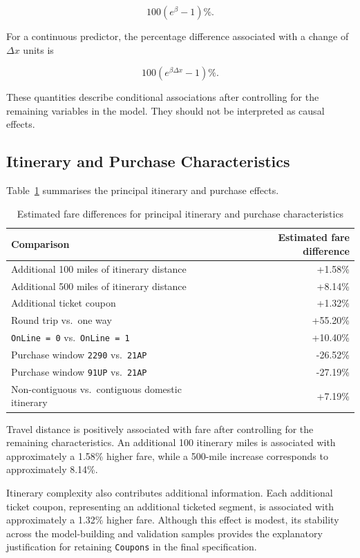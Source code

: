 \documentclass[11pt,a4paper]{article}
\begin{document}
\[
100\left(e^\beta-1\right)\%.
\]

For a continuous predictor, the percentage difference associated with a change of \(\Delta x\) units is

\[
100\left(e^{\beta \Delta x}-1\right)\%.
\]

These quantities describe conditional associations after controlling for the remaining variables in the model. They should not be interpreted as causal effects.

\subsection{Itinerary and Purchase Characteristics}

Table~\ref{tab:main-economic-effects} summarises the principal itinerary and purchase effects.

\begin{table}[H]
\centering
\caption{Estimated fare differences for principal itinerary and purchase characteristics}
\label{tab:main-economic-effects}
\begin{tabular}{lr}
\toprule
\textbf{Comparison} & \textbf{Estimated fare difference} \\
\midrule
Additional 100 miles of itinerary distance & +1.58\% \\
Additional 500 miles of itinerary distance & +8.14\% \\
Additional ticket coupon & +1.32\% \\
Round trip vs.\ one way & +55.20\% \\
\texttt{OnLine = 0} vs.\ \texttt{OnLine = 1} & +10.40\% \\
Purchase window \texttt{2290} vs.\ \texttt{21AP} & -26.52\% \\
Purchase window \texttt{91UP} vs.\ \texttt{21AP} & -27.19\% \\
Non-contiguous vs.\ contiguous domestic itinerary & +7.19\% \\
\bottomrule
\end{tabular}
\end{table}

Travel distance is positively associated with fare after controlling for the remaining characteristics. An additional 100 itinerary miles is associated with approximately a 1.58\% higher fare, while a 500-mile increase corresponds to approximately 8.14\%.

Itinerary complexity also contributes additional information. Each additional ticket coupon, representing an additional ticketed segment, is associated with approximately a 1.32\% higher fare. Although this effect is modest, its stability across the model-building and validation samples provides the explanatory justification for retaining \texttt{Coupons} in the final specification.
\end{document}
